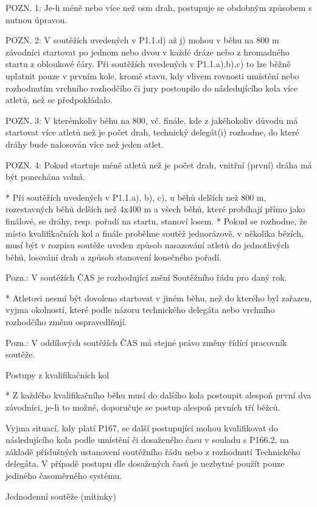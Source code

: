 POZN. 1: Je-li méně nebo více  než osm drah, postupuje se obdobným způsobem s nutnou úpravou.

POZN. 2: V soutěžích uvedených v P1.1.d) až j) mohou v běhu na 800 m závodníci startovat po jednom nebo dvou v každé dráze nebo z hromadného startu z obloukové čáry. Při soutěžích uvedených v P1.1.a),b),c) to lze běžně uplatnit pouze v prvním kole, kromě stavu, kdy vlivem rovnosti umístění nebo rozhodnutím vrchního rozhodčího či jury postoupilo do následujícího kola více atletů, než se předpokládalo.

POZN. 3: V kterémkoliv běhu na 800, vč. finále, kde z jakéhokoliv důvodu má startovat více atletů než je počet drah, technický delegát(i) rozhodne, do které dráhy bude nalosován více než jeden atlet.

POZN. 4: Pokud startuje méně atletů než je počet drah, vnitřní (první) dráha má být ponechána volná.

* Při soutěžích uvedených v P1.1.a), b), c), u běhů delších než 800 m, rozestavných běhů delších než 4x400 m a všech běhů, které probíhají přímo jako finálové, se dráhy, resp. pořadí na startu, stanoví losem.
* Pokud se rozhodne, že místo kvalifikačních kol a finále proběhne soutěž jednorázově, v několika bězích, musí být v rozpisu soutěže uveden způsob nasazování atletů do jednotlivých běhů, losování drah a způsob stanovení konečného pořadí.

Pozn.: V soutěžích ČAS je rozhodující znění Soutěžního řádu pro daný rok.

* Atletovi nesmí být dovoleno startovat v jiném běhu, než do kterého byl zařazen, vyjma okolností, které podle názoru technického delegáta nebo vrchního rozhodčího změnu ospravedlňují.

Pozn.: V oddílových soutěžích ČAS má stejné právo změny řídící pracovník soutěže.

Postupy z kvalifikačních kol

* Z každého kvalifikačního běhu musí do dalšího kola postoupit alespoň první dva závodníci, je-li to možné, doporučuje se postup alespoň prvních tří běžců.

Vyjma situací, kdy platí P167, se další postupující mohou kvalifikovat do následujícího kola podle umístění či dosaženého času v souladu s P166.2, na základě příslušných ustanovení soutěžního řádu nebo z rozhodnutí Technického delegáta. V případě postupu dle dosažených časů je nezbytné použít pouze jediného časoměrného systému.

Jednodenní soutěže (mítinky)

